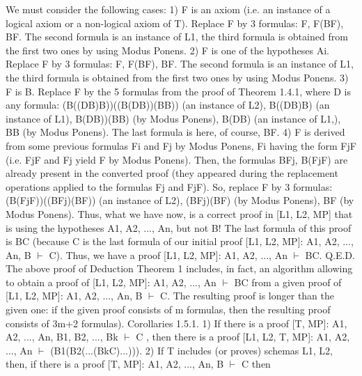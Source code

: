 We must consider the following cases:
1) F is an axiom (i.e. an instance of a logical axiom or a non-logical axiom of T). Replace F by 3
formulas: F, F\IMPLIES (B\IMPLIES F), B\IMPLIES F. The second formula is an instance of L1, the third formula is obtained
from the first two ones by using Modus Ponens.
2) F is one of the hypotheses Ai. Replace F by 3 formulas: F, F\IMPLIES (B\IMPLIES F), B\IMPLIES F. The second formula is an
instance of L1, the third formula is obtained from the first two ones by using Modus Ponens.
3) F is B. Replace F by the 5 formulas from the proof of Theorem 1.4.1, where D is any formula:
(B\IMPLIES ((D\IMPLIES B)\IMPLIES B))\IMPLIES ((B\IMPLIES (D\IMPLIES B))\IMPLIES (B\IMPLIES B)) (an instance of L2),
B\IMPLIES ((D\IMPLIES B)\IMPLIES B) (an instance of L1),
B\IMPLIES (D\IMPLIES B))\IMPLIES (B\IMPLIES B) (by Modus Ponens),
B\IMPLIES (D\IMPLIES B) (an instance of L1,),
B\IMPLIES B (by Modus Ponens).
The last formula is here, of course, B\IMPLIES F.
4) F is derived from some previous formulas Fi and Fj by Modus Ponens, Fi having the form Fj\IMPLIES F (i.e.
Fj\IMPLIES F and Fj yield F by Modus Ponens). Then, the formulas
B\IMPLIES Fj,
B\IMPLIES (Fj\IMPLIES F)
are already present in the converted proof (they appeared during the replacement operations applied to the
formulas Fj and Fj\IMPLIES F). So, replace F by 3 formulas:
(B\IMPLIES (Fj\IMPLIES F))\IMPLIES ((B\IMPLIES Fj)\IMPLIES (B\IMPLIES F)) (an instance of L2),
(B\IMPLIES Fj)\IMPLIES (B\IMPLIES F) (by Modus Ponens),
B\IMPLIES F (by Modus Ponens).
Thus, what we have now, is a correct proof in [L1, L2, MP] that is using the hypotheses A1, A2, ..., An, but
not B! The last formula of this proof is B\IMPLIES C (because C is the last formula of our initial proof [L1, L2,
MP]: A1, A2, ..., An, B \(\vdash\) C). Thus, we have a proof [L1, L2, MP]: A1, A2, ..., An \(\vdash\) B\IMPLIES C. Q.E.D.
The above proof of Deduction Theorem 1 includes, in fact, an algorithm allowing to obtain a proof of
[L1, L2, MP]: A1, A2, ..., An \(\vdash\) B\IMPLIES C from a given proof of [L1, L2, MP]: A1, A2, ..., An, B \(\vdash\) C. The
resulting proof is longer than the given one: if the given proof consists of m formulas, then the resulting
proof consists of 3m+2 formulas).
Corollaries 1.5.1. 1) If there is a proof [T, MP]: A1, A2, ..., An, B1, B2, ..., Bk \(\vdash\) C , then there is a proof
[L1, L2, T, MP]: A1, A2, ..., An \(\vdash\) (B1\IMPLIES (B2\IMPLIES (...\IMPLIES (Bk\IMPLIES C)...))).
2) If T includes (or proves) schemas L1, L2, then, if there is a proof [T, MP]: A1, A2, ..., An, B \(\vdash\) C then
